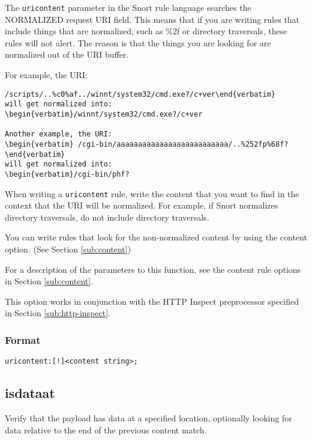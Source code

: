 \documentclass[english]{report}
\begin{document}
The \texttt{uricontent} parameter in the Snort rule language searches the NORMALIZED
request \textsc{URI} field.  This means that if you are writing rules that include
things that are normalized, such as \%2f or directory traversals, these rules
will not alert.  The reason is that the things you are looking for are
normalized out of the URI buffer.  

For example, the URI: 
\begin{verbatim}/scripts/..%c0%af../winnt/system32/cmd.exe?/c+ver\end{verbatim}
will get normalized into:
\begin{verbatim}/winnt/system32/cmd.exe?/c+ver

Another example, the URI:
\begin{verbatim} /cgi-bin/aaaaaaaaaaaaaaaaaaaaaaaaaa/..%252fp%68f? \end{verbatim}
will get normalized into:
\begin{verbatim}/cgi-bin/phf?\end{verbatim}

When writing a \texttt{uricontent} rule, write the content that you want to find in the
context that the URI will be normalized.  For example, if Snort normalizes directory traversals, do not include directory traversals.  

You can write rules that look for the non-normalized content by using the content option.  (See Section \ref{sub:content})

For a description of the parameters to this function, see the content rule
options in Section \ref{sub:content}. 

This option works in conjunction with the HTTP Inspect preprocessor specified
in Section \ref{sub:http-inspect}.

\subsubsection{Format}

\begin{verbatim}
uricontent:[!]<content string>;
\end{verbatim}

\subsection{isdataat}

Verify that the payload has data at a specified location, optionally looking for data relative to the end of the previous content match.
\end{document}
